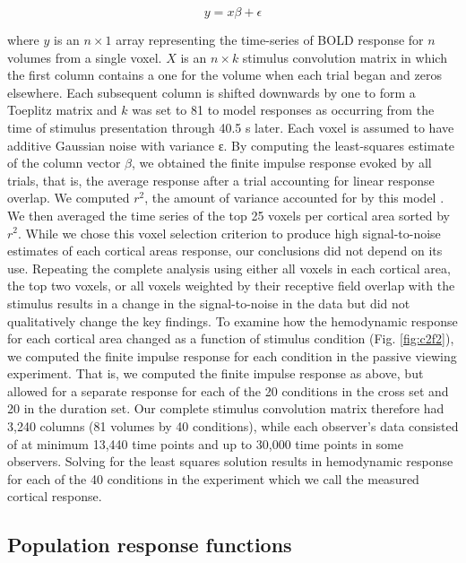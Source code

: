 \begin{equation}
    y=x\beta+\epsilon
\end{equation}

where $y$ is an $n\times 1$ array representing the time-series of BOLD response for $n$ volumes from a single voxel. $X$ is an $n\times k$ stimulus convolution matrix in which the first column contains a one for the volume when each trial began and zeros elsewhere. Each subsequent column is shifted downwards by one to form a Toeplitz matrix and $k$ was set to 81 to model responses as occurring from the time of stimulus presentation through 40.5 s later. Each voxel is assumed to have additive Gaussian noise with variance ε. By computing the least-squares estimate of the column vector $\beta$, we obtained the finite impulse response evoked by all trials, that is, the average response after a trial accounting for linear response overlap. We computed $r^2$, the amount of variance accounted for by this model \citep{Gardner2005-pg}. We then averaged the time series of the top 25 voxels per cortical area sorted by $r^2$. While we chose this voxel selection criterion to produce high signal-to-noise estimates of each cortical areas response, our conclusions did not depend on its use. Repeating the complete analysis using either all voxels in each cortical area, the top two voxels, or all voxels weighted by their receptive field overlap with the stimulus results in a change in the signal-to-noise in the data but did not qualitatively change the key findings.
To examine how the hemodynamic response for each cortical area changed as a function of stimulus condition (Fig. \ref{fig:c2f2}), we computed the finite impulse response for each condition in the passive viewing experiment. That is, we computed the finite impulse response as above, but allowed for a separate response for each of the 20 conditions in the cross set and 20 in the duration set. Our complete stimulus convolution matrix therefore had 3,240 columns (81 volumes by 40 conditions), while each observer’s data consisted of at minimum 13,440 time points and up to 30,000 time points in some observers. Solving for the least squares solution results in hemodynamic response for each of the 40 conditions in the experiment which we call the measured cortical response.

\subsection{Population response functions}

